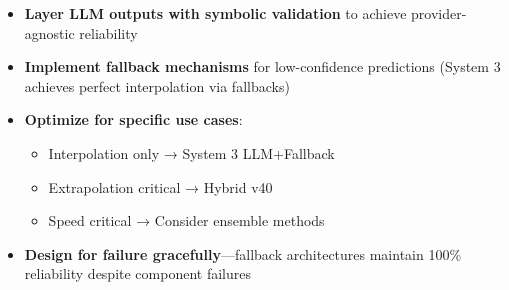 \begin{itemize}
    \item \textbf{Layer LLM outputs with symbolic validation} to achieve provider-agnostic reliability
    \item \textbf{Implement fallback mechanisms} for low-confidence predictions (System 3 achieves perfect interpolation via fallbacks)
    \item \textbf{Optimize for specific use cases}:
    \begin{itemize}
        \item Interpolation only → System 3 LLM+Fallback
        \item Extrapolation critical → Hybrid v40
        \item Speed critical → Consider ensemble methods
    \end{itemize}
    \item \textbf{Design for failure gracefully}—fallback architectures maintain 100\% reliability despite component failures
\end{itemize}


